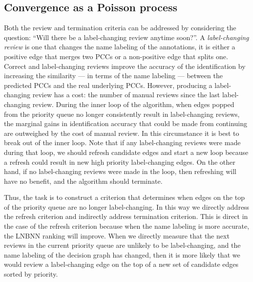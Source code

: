 \subsection{Convergence as a Poisson process}


Both the review and termination criteria can be addressed by considering the question:
``Will there be a label-changing review anytime soon?''.
A \emph{label-changing review} is one that changes the name labeling of the annotations, \ie{} it is either
  a positive edge that merges two PCCs or a non-positive edge that splits one.
Correct and label-changing reviews improve the accuracy of the identification by increasing the similarity --- in
  terms of the name labeling --- between the predicted PCCs and the real underlying PCCs.
However, producing a label-changing review has a cost:
the number of manual reviews since the last label-changing review.
During the inner loop of the algorithm, when edges popped from the priority queue no longer consistently result
  in label-changing reviews, the marginal gains in identification accuracy that could be made from continuing are
  outweighed by the cost of manual review.
In this circumstance it is best to break out of the inner loop.
Note that if any label-changing reviews were made during that loop, we should refresh candidate edges and start a
  new loop because a refresh could result in new high priority label-changing edges.
On the other hand, if no label-changing reviews were made in the loop, then refreshing will have no benefit, and
  the algorithm should terminate.

Thus, the task is to construct a criterion that determines when edges on the top of the priority queue are no
  longer label-changing.
In this way we directly address the refresh criterion and indirectly address termination criterion.
This is direct in the case of the refresh criterion because when the name labeling is more accurate, the LNBNN
  ranking will improve.
When we directly measure that the next reviews in the current priority queue are unlikely to be label-changing, and
  the name labeling of the decision graph has changed, then it is more likely that we would review a label-changing
  edge on the top of a new set of candidate edges sorted by priority.

